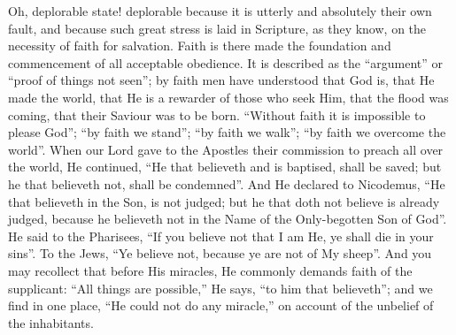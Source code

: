 Oh, deplorable state! deplorable because it is utterly and
absolutely their own fault, and because such great stress is laid in
Scripture, as they know, on the necessity of faith for salvation.
Faith is there made the foundation and commencement of all acceptable
obedience. It is described as the ``argument'' or ``proof
of things not seen''; by faith men have understood that God is,
that He made the world, that He is a rewarder of those who seek Him,
that the flood was coming, that their Saviour was to be born.
``Without faith it is impossible to please God''; ``by
faith we stand''; ``by faith we walk''; ``by faith we
overcome the world''. When our Lord gave to the Apostles their
commission to preach all over the world, He continued, ``He that
believeth and is baptised, shall be saved; but he that believeth not,
shall be condemned''. And He declared to Nicodemus, ``He that
believeth in the Son, is not judged; but he that doth not believe is
already judged, because he believeth not in the Name of the
Only-begotten Son of God''. He said to the Pharisees, ``If you
believe not that I am He, ye shall die in your sins''. To the
Jews, ``Ye believe not, because ye are not of My sheep''. And
you may recollect that before His miracles, He commonly demands faith
of the supplicant: ``All things are possible,'' He says,
``to him that believeth''; and we find in one place, ``He
could not do any miracle,'' on account of the unbelief of the
inhabitants.

